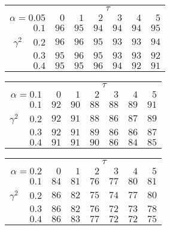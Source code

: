 \begin{tabular}{r|rrrrrr}
\hline\hline
 &\multicolumn{6}{c}{$\tau$} \\ 
 $\alpha = 0.05$ & $0$ & $1$ & $2$ & $3$ & $4$ & $5$ \\ 
 \hline$0.1$ & $96$ & $95$ & $94$ & $94$ & $94$ & $95$\\ 
$\gamma^2\;\;\;$ $0.2$ & $96$ & $96$ & $95$ & $93$ & $93$ & $94$\\ 
$0.3$ & $95$ & $96$ & $95$ & $93$ & $93$ & $92$\\ 
$0.4$ & $95$ & $95$ & $96$ & $94$ & $92$ & $91$\\ 
 \hline 
 \end{tabular}
 
 \vspace{2em} 
 
\begin{tabular}{r|rrrrrr}
\hline\hline
 &\multicolumn{6}{c}{$\tau$} \\ 
 $\alpha = 0.1$ & $0$ & $1$ & $2$ & $3$ & $4$ & $5$ \\ 
 \hline$0.1$ & $92$ & $90$ & $88$ & $88$ & $89$ & $91$\\ 
$\gamma^2\;\;\;$ $0.2$ & $92$ & $91$ & $88$ & $86$ & $87$ & $89$\\ 
$0.3$ & $92$ & $91$ & $89$ & $86$ & $86$ & $87$\\ 
$0.4$ & $91$ & $91$ & $90$ & $86$ & $84$ & $85$\\ 
 \hline 
 \end{tabular}
 
 \vspace{2em} 
 
\begin{tabular}{r|rrrrrr}
\hline\hline
 &\multicolumn{6}{c}{$\tau$} \\ 
 $\alpha = 0.2$ & $0$ & $1$ & $2$ & $3$ & $4$ & $5$ \\ 
 \hline$0.1$ & $84$ & $81$ & $76$ & $77$ & $80$ & $81$\\ 
$\gamma^2\;\;\;$ $0.2$ & $86$ & $82$ & $75$ & $74$ & $77$ & $80$\\ 
$0.3$ & $86$ & $82$ & $76$ & $72$ & $73$ & $78$\\ 
$0.4$ & $86$ & $83$ & $77$ & $72$ & $72$ & $75$\\ 
 \hline 
 \end{tabular}